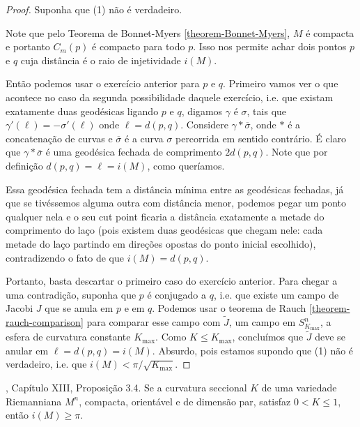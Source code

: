\begin{proof}
Suponha que (1) não é verdadeiro.

Note que pelo Teorema de Bonnet-Myers
\ref{theorem-Bonnet-Myers}, $M$ é compacta e
portanto $C_m(p)$ é compacto para
todo $p$. Isso nos permite achar dois pontos
$p$ e $q$ cuja distância é o raio
de injetividade  $i(M)$.

Então podemos usar o exercício anterior para
$p$ e $q$.  Primeiro vamos ver o
que acontece no caso da segunda possibilidade
daquele exercício, i.e. que
existam exatamente duas geodésicas ligando
$p$ e $q$, digamos $\gamma$ é
$\sigma$, tais que
$\gamma'(\ell)=-\sigma'(\ell)$ onde
$\ell=d(p,q)$.  Considere
$\gamma * \overline{\sigma}$, onde $*$ é a
concatenação de curvas e
$\overline{\sigma}$ é a curva $\sigma$
percorrida em sentido contrário. É claro
que $\gamma * \overline{\sigma}$ é uma
geodésica fechada de comprimento $2
d(p,q)$. Note que por definição
$d(p,q)=\ell=i(M)$, como queríamos.

Essa geodésica fechada tem a distância mínima
entre as geodésicas fechadas, já
que se tivéssemos alguma outra com distância
menor, podemos pegar um ponto
qualquer nela e o seu cut point ficaria a
distância exatamente a metade do
comprimento do laço (pois existem duas
geodésicas que chegam nele: cada
metade do laço partindo em direções opostas
do ponto inicial escolhido),
contradizendo o fato de que $i(M)=d(p,q)$.

Portanto, basta descartar o primeiro caso do
exercício anterior. Para chegar a
 uma contradição, suponha que $p $ é
 conjugado a $q$, i.e. que existe um campo
 de Jacobi $J$ que se anula em $p$ e em $q$.
Podemos usar o teorema de Rauch
\ref{theorem-rauch-comparison} para comparar esse campo
com $\tilde{J}$,
um campo em $S^n_{K_{\text{max}}}$, a esfera
de curvatura constante
 $K_{\text{max}}$. Como $K \leq
 K_{\text{max}}$,
concluímos que $\tilde{J}$ deve se anular em
$\ell=d(p,q)=i(M)$. Absurdo, pois
estamos supondo que (1) não é verdadeiro,
i.e. que
 $i(M) < \pi/\sqrt{K_{\text{max}}}$.
\end{proof}

\begin{exercise}
\label{exercise-l8-3}
\cite{doc}, Capítulo XIII, Proposição 3.4. Se
a curvatura seccional $K$ de uma
variedade Riemanniana $M^n$, compacta,
orientável e de dimensão par, satisfaz
$0<K \leq 1$, então $i(M) \geq \pi$.
\end{exercise}

